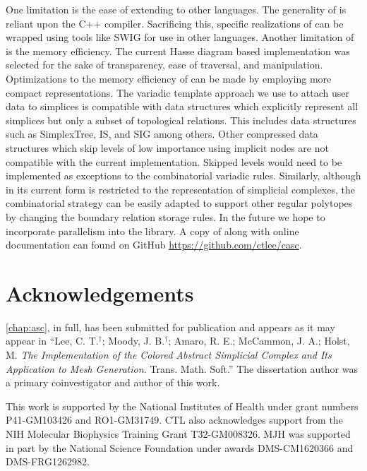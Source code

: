 \par One limitation is the ease of extending to other languages.
The generality of \asc is reliant upon the C++ compiler.
Sacrificing this, specific realizations of \asc can be wrapped using tools like SWIG for use in other languages.
Another limitation of \asc is the memory efficiency.
The current Hasse diagram based implementation was selected for the sake of transparency, ease of traversal, and manipulation.
Optimizations to the memory efficiency of \asc can be made by employing more compact representations.
The variadic template approach we use to attach user data to simplices is compatible with data structures which explicitly represent all simplices but only a subset of topological relations.
This includes data structures such as SimplexTree\cite{Boissonnat2012}, IS\cite{DeFloriani2010b}, and SIG\cite{DeFloriani2004} among others.
Other compressed data structures which skip levels of low importance using implicit nodes are not compatible with the current \asc implementation.
Skipped levels would need to be implemented as exceptions to the combinatorial variadic rules.
Similarly, although \asc in its current form is restricted to the representation of simplicial complexes, the combinatorial strategy can be easily adapted to support other regular polytopes by changing the boundary relation storage rules.
In the future we hope to incorporate parallelism into the \asc library.
A copy of \asc along with online documentation can found on GitHub \url{https://github.com/ctlee/casc}.

\section{Acknowledgements}
\par \cref{chap:asc}, in full, has been submitted for publication and appears as it may appear in
``Lee, C. T.$^{\dagger}$; Moody, J. B.$^{\dagger}$; Amaro, R. E.; McCammon, J. A.; Holst, M. \emph{The Implementation of the Colored Abstract Simplicial Complex and Its Application to Mesh Generation.} Trans. Math. Soft.''
The dissertation author was a primary coinvestigator and author of this work.

\par This work is supported by the National Institutes of Health under grant numbers P41-GM103426 and RO1-GM31749.
CTL also acknowledges support from the NIH Molecular Biophysics Training Grant T32-GM008326.
MJH was supported in part by the National Science Foundation under awards DMS-CM1620366 and DMS-FRG1262982.

